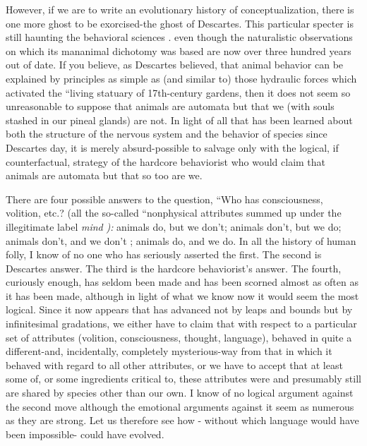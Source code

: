 However, if we are to write an evolutionary history of con\-ceptualization, there is one more ghost to be exorcised-the ghost of Descartes. This particular specter is still haunting the behavioral sci\-ences . even though the naturalistic observations on which its man\-animal dichotomy was based are now over three hundred years out of date. If you believe, as Descartes believed, that animal behavior can be explained by principles as simple as (and similar to) those hydraulic forces which activated the ``living statuary of 17th-century  gardens, then it does not seem so unreasonable to suppose that animals are automata but that we (with souls stashed in our pineal glands) are not. In light of all that has been learned about both the structure of the nervous system and the behavior of species since Descartes day, it is merely absurd-possible to salvage only with the logical, if counter\-factual, strategy of the hardcore behaviorist who would claim that animals are automata but that so too are we.


There are four possible answers to the question, ``Who has con\-sciousness, volition, etc.? (all the so-called ``nonphysical attributes summed up under the illegitimate label \textit{mind} \textit{):} animals do, but we don't; animals don't, but we do; animals don't, and we don't ; animals do, and we do. In all the history of human folly, I know of no one who has seriously asserted the first. The second is Descartes answer. The third is the hardcore behaviorist's answer. The fourth, curiously enough, has seldom been made and has been scorned almost as often as it has been made, although in light of what we know now it would seem the most logical. Since it now appears that  has ad\-vanced not by leaps and bounds but by infinitesimal gradations, we either have to claim that with respect to a particular set of attributes (volition, consciousness, thought, language),  behaved in quite a different-and, incidentally, completely mysterious-way from that in which it behaved with regard to all other attributes, or we have to accept that at least some of, or some ingredients critical to, these attributes were and presumably still are shared by species other than our own. I know of no logical argument against the second move although the emotional arguments against it seem as numerous as they are strong. Let us therefore see how - without which language would have been impossible- could have evolved.

